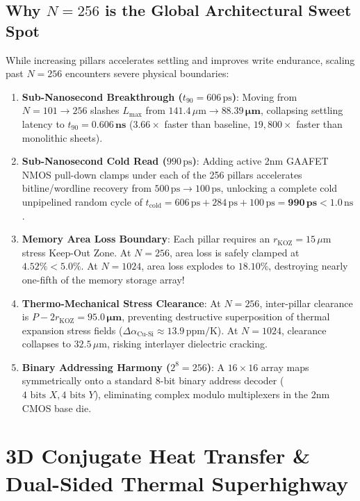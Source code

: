 \documentclass[journal]{IEEEtran}
\begin{document}
\subsection{Why $N = 256$ is the Global Architectural Sweet Spot}
While increasing pillars accelerates settling and improves write endurance, scaling past $N = 256$ encounters severe physical boundaries:
\begin{enumerate}
    \item \textbf{Sub-Nanosecond Breakthrough ($t_{90} = 606\,\text{ps}$)}: Moving from $N=101 \to 256$ slashes $L_{\max}$ from $141.4\,\mu\text{m} \to \mathbf{88.39\,\mu\text{m}}$, collapsing settling latency to $t_{90} = \mathbf{0.606\,\text{ns}}$ ($3.66\times$ faster than baseline, $19,800\times$ faster than monolithic sheets).
    \item \textbf{Sub-Nanosecond Cold Read ($990\,\text{ps}$)}: Adding active 2nm GAAFET NMOS pull-down clamps under each of the 256 pillars accelerates bitline/wordline recovery from $500\,\text{ps} \to 100\,\text{ps}$, unlocking a complete cold unpipelined random cycle of $t_{\text{cold}} = 606\,\text{ps} + 284\,\text{ps} + 100\,\text{ps} = \mathbf{990\,\text{ps}} < 1.0\,\text{ns}$.
    \item \textbf{Memory Area Loss Boundary}: Each pillar requires an $r_{\text{KOZ}} = 15\,\mu\text{m}$ stress Keep-Out Zone. At $N=256$, area loss is safely clamped at $\mathbf{4.52\%} < 5.0\%$. At $N=1024$, area loss explodes to $\mathbf{18.10\%}$, destroying nearly one-fifth of the memory storage array!
    \item \textbf{Thermo-Mechanical Stress Clearance}: At $N=256$, inter-pillar clearance is $P - 2 r_{\text{KOZ}} = \mathbf{95.0\,\mu\text{m}}$, preventing destructive superposition of thermal expansion stress fields ($\Delta \alpha_{\text{Cu-Si}} \approx 13.9\,\text{ppm/K}$). At $N=1024$, clearance collapses to $32.5\,\mu\text{m}$, risking interlayer dielectric cracking.
    \item \textbf{Binary Addressing Harmony ($2^8 = 256$)}: A $16 \times 16$ array maps symmetrically onto a standard 8-bit binary address decoder ($4\text{ bits } X, 4\text{ bits } Y$), eliminating complex modulo multiplexers in the 2nm CMOS base die.
\end{enumerate}

\section{3D Conjugate Heat Transfer \& Dual-Sided Thermal Superhighway}
\label{sec:thermal_superhighway}
\end{document}
